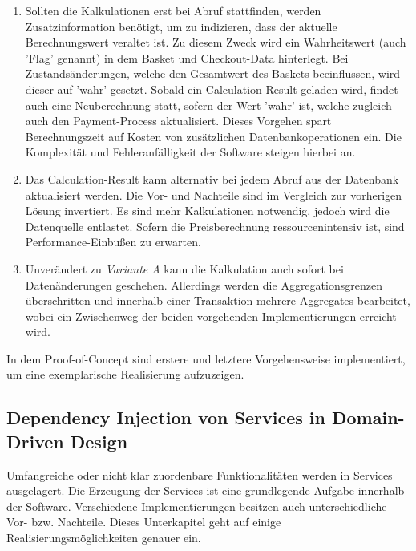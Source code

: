 \begin{enumerate}[topsep=-2pt]
	\item { Sollten die Kalkulationen erst bei Abruf stattfinden, werden Zusatzinformation benötigt, um zu indizieren, dass der aktuelle Berechnungswert veraltet ist. Zu diesem Zweck wird ein Wahrheitswert (auch 'Flag' genannt) in dem Basket und Checkout-Data hinterlegt. Bei Zustandsänderungen, welche den Gesamtwert des Baskets beeinflussen, wird dieser auf 'wahr' gesetzt. Sobald ein Calculation-Result geladen wird, findet auch eine Neuberechnung statt, sofern der Wert 'wahr' ist, welche zugleich auch den Payment-Process aktualisiert. Dieses Vorgehen spart Berechnungszeit auf Kosten von zusätzlichen Datenbankoperationen ein. Die Komplexität und Fehleranfälligkeit der Software steigen hierbei an.  }
	\item { Das Calculation-Result kann alternativ bei jedem Abruf aus der Datenbank aktualisiert werden. Die Vor- und Nachteile sind im Vergleich zur vorherigen Lösung invertiert. Es sind mehr Kalkulationen notwendig, jedoch wird die Datenquelle entlastet. Sofern die Preisberechnung ressourcenintensiv ist, sind Performance-Einbußen zu erwarten.  }
	\item { Unverändert zu \emph{Variante A} kann die Kalkulation auch sofort bei Datenänderungen geschehen. Allerdings werden die Aggregationsgrenzen überschritten und innerhalb einer Transaktion mehrere Aggregates bearbeitet, wobei ein Zwischenweg der beiden vorgehenden Implementierungen erreicht wird.  }
\end{enumerate}

In dem Proof-of-Concept sind erstere und letztere Vorgehensweise implementiert, um eine exemplarische Realisierung aufzuzeigen.


\subsection{Dependency Injection von Services in Domain-Driven Design}

Umfangreiche oder nicht klar zuordenbare Funktionalitäten werden in Services ausgelagert. Die Erzeugung der Services ist eine grundlegende Aufgabe innerhalb der Software. Verschiedene Implementierungen besitzen auch unterschiedliche Vor- bzw. Nachteile. Dieses Unterkapitel geht auf einige Realisierungsmöglichkeiten genauer ein. 

